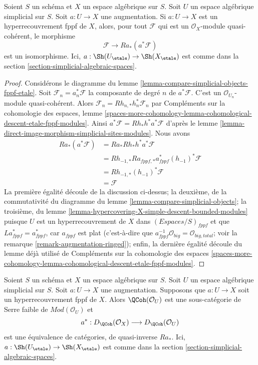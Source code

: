 \begin{lemma}
\label{lemma-cohomological-descent-qcoh-for-fppf-hypercovering}
Soient $S$ un schéma et $X$ un espace algébrique sur $S$.
Soit $U$ un espace algébrique simplicial sur $S$. Soit $a : U \to X$
une augmentation. Si $a : U \to X$ est un hyperrecouvrement fppf de $X$,
alors, pour tout $\mathcal{F}$ qui est un $\mathcal{O}_X$-module quasi-cohérent,
le morphisme
$$
\mathcal{F} \to Ra_*(a^*\mathcal{F})
$$
est un isomorphisme. Ici, $a : \Sh(U_\etale) \to \Sh(X_\etale)$
est comme dans la section \ref{section-simplicial-algebraic-spaces}.
\end{lemma}

\begin{proof}
Considérons le diagramme du lemme \ref{lemma-compare-simplicial-objects-fppf-etale}.
Soit $\mathcal{F}_n = a_n^*\mathcal{F}$ la composante de degré $n$ de
$a^*\mathcal{F}$. C'est un $\mathcal{O}_{U_n}$-module quasi-cohérent.
Alors $\mathcal{F}_n = Rh_{n, *}h_n^*\mathcal{F}_n$
par Compléments sur la cohomologie des espaces, lemme
\ref{spaces-more-cohomology-lemma-cohomological-descent-etale-fppf-modules}.
Ainsi $a^*\mathcal{F} = Rh_*h^*a^*\mathcal{F}$ d'après le
lemme \ref{lemma-direct-image-morphism-simplicial-sites-modules}.
Nous avons
\begin{align*}
Ra_*(a^*\mathcal{F})
& =
Ra_*Rh_*h^*a^*\mathcal{F} \\
& =
Rh_{-1, *}Ra_{fppf, *}a_{fppf}^*(h_{-1})^*\mathcal{F} \\
& =
Rh_{-1, *}(h_{-1})^*\mathcal{F} \\
& =
\mathcal{F}
\end{align*}
La première égalité découle de la discussion ci-dessus; la deuxième,
de la commutativité du diagramme du lemme
\ref{lemma-compare-simplicial-objects}; la troisième, du lemme
\ref{lemma-hypercovering-X-simple-descent-bounded-modules}
puisque $U$ est un hyperrecouvrement de $X$ dans $(\textit{Espaces}/S)_{fppf}$
et que $La_{fppf}^* = a_{fppf}^*$, car $a_{fppf}$ est plat
(c'est-à-dire que $a_{fppf}^{-1}\mathcal{O}_{big} = \mathcal{O}_{big, total}$;
voir la remarque \ref{remark-augmentation-ringed}); enfin,
la dernière égalité découle du lemme déjà utilisé de
Compléments sur la cohomologie des espaces
\ref{spaces-more-cohomology-lemma-cohomological-descent-etale-fppf-modules}.
\end{proof}

\begin{lemma}
\label{lemma-coh-descent-qcoh-unbounded-for-fppf-hypercovering}
Soient $S$ un schéma et $X$ un espace algébrique sur $S$.
Soit $U$ un espace algébrique simplicial sur $S$. Soit $a : U \to X$
une augmentation. Supposons que $a : U \to X$ soit un hyperrecouvrement fppf de $X$.
Alors $\QCoh(\mathcal{O}_U)$ est une sous-catégorie de Serre faible de
$\textit{Mod}(\mathcal{O}_U)$ et
$$
a^* : D_\QCoh(\mathcal{O}_X) \longrightarrow D_\QCoh(\mathcal{O}_U)
$$
est une équivalence de catégories, de quasi-inverse
$Ra_*$. Ici, $a : \Sh(U_\etale) \to \Sh(X_\etale)$
est comme dans la section \ref{section-simplicial-algebraic-spaces}.
\end{lemma}

